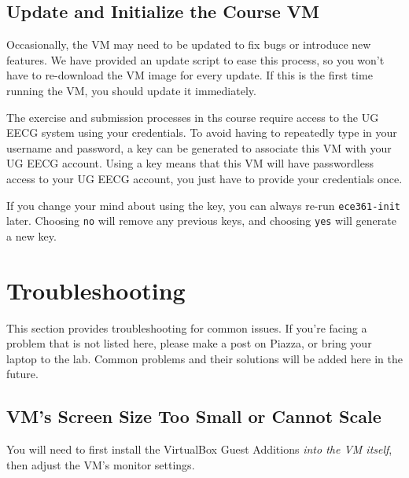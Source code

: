 \documentclass[11pt]{article}
\begin{document}
\subsection{Update and Initialize the Course VM}
\label{subsec:update-init-vm}
Occasionally, the VM may need to be updated to fix bugs or introduce new features. We have provided an update script to ease this process, so you won't have to re-download the VM image for every update. If this is the first time running the VM, you should update it immediately.

The exercise and submission processes in ths course require access to the UG EECG system using your credentials. To avoid having to repeatedly type in your username and password, a key can be generated to associate this VM with your UG EECG account. Using a key means that this VM will have passwordless access to your UG EECG account, you just have to provide your credentials once.

If you change your mind about using the key, you can always re-run \texttt{ece361-init} later. Choosing \texttt{no} will remove any previous keys, and choosing \texttt{yes} will generate a new key.


\newpage
\section{Troubleshooting}
\label{sec:troubleshooting}
This section provides troubleshooting for common issues. If you're facing a problem that is not listed here, please make a post on Piazza, or bring your laptop to the lab. Common problems and their solutions will be added here in the future.

\subsection{VM's Screen Size Too Small or Cannot Scale}
\label{subsec:tshoot-screen-size}
You will need to first install the VirtualBox Guest Additions \textit{into the VM itself}, then adjust the VM's monitor settings.
\end{document}
